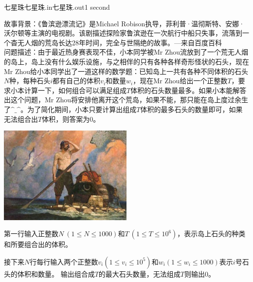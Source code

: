 \begin{problem}{七星珠}{七星珠.in}{七星珠.out}{1 second}


故事背景：《鲁滨逊漂流记》是Michael Robison执导，菲利普·温彻斯特、安娜·沃尔顿等主演的电视剧。该剧描述探险家鲁滨逊在一次航行中船只失事，流落到一个杳无人烟的荒岛长达28年时间，完全与世隔绝的故事。---来自百度百科\\
问题描述：由于最近热身赛表现不佳，小本同学被Mr Zhou流放到了一个荒无人烟的岛上，岛上没有什么娱乐设施，与之相伴的只有各种各样奇形怪状的石头，现在Mr Zhou给小本同学出了一道这样的数学题：已知岛上一共有各种不同体积的石头$N$种，每种石头$i$都有自己的体积$v_i$和数量$w_i$，现在Mr Zhou给出一个正整数$T$，要求小本计算一下，如何组合可以满足组成$T$体积的石头数量最多。如果小本能解答出这个问题，Mr Zhou将安排他离开这个荒岛，如果不能，那只能在岛上度过余生了$\^{} \_ \^{}$。为了简化期间，小本只要计算出组成$T$体积的最多石头的数量即可，如果无法组合出$T$体积，则答案为$0$。
\begin{center}
\includegraphics[width=0.5\textwidth]{pics/G.jpg}
\end{center}
\InputFile
第一行输入正整数$N\ (1\le N\le 1000)$和$T\ (1\le T\le 10^6)$，表示岛上石头的种类和所要组合出的体积。

接下来$N$行每行输入两个正整数$v_i(1\le v_i\le 10^5)$和$w_i(1\le w_i\le 1000)$表示$i$号石头的体积和数量。
\OutputFile
输出组合成$T$的最大石头数量，无法组成$T$则输出$0$。
\Example
\begin{example}
%
\end{example}
\end{problem}